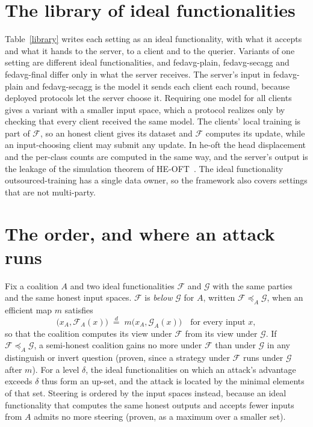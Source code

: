 \documentclass{labreport}
\newcommand{\IF}{\mathcal{F}}
\newcommand{\IG}{\mathcal{G}}
\begin{document}
\section{The library of ideal functionalities}

Table~\ref{library} writes each setting as an ideal functionality, with what it accepts and what it hands to the server, to a client and to the querier.
Variants of one setting are different ideal functionalities, and fedavg-plain, fedavg-secagg and fedavg-final differ only in what the server receives.
The server's input in fedavg-plain and fedavg-secagg is the model it sends each client each round, because deployed protocols let the server choose it.
Requiring one model for all clients gives a variant with a smaller input space, which a protocol realizes only by checking that every client received the same model.
The clients' local training is part of $\IF$, so an honest client gives its dataset and $\IF$ computes its update, while an input-choosing client may submit any update.
In he-oft the head displacement and the per-class counts are computed in the same way, and the server's output is the leakage of the simulation theorem of HE-OFT~\cite{KSK26}.
The ideal functionality outsourced-training has a single data owner, so the framework also covers settings that are not multi-party.



\section{The order, and where an attack runs}

Fix a coalition $A$ and two ideal functionalities $\IF$ and $\IG$ with the same parties and the same honest input spaces.
$\IF$ is \emph{below} $\IG$ for $A$, written $\IF\preceq_A\IG$, when an efficient map $m$ satisfies
\[
  \bigl(x_A,\IF_A(x)\bigr)\;\stackrel{d}{=}\;m\bigl(x_A,\IG_A(x)\bigr)\quad\text{for every input } x,
\]
so that the coalition computes its view under $\IF$ from its view under $\IG$.
If $\IF\preceq_A\IG$, a semi-honest coalition gains no more under $\IF$ than under $\IG$ in any distinguish or invert question (proven, since a strategy under $\IF$ runs under $\IG$ after $m$).
For a level $\delta$, the ideal functionalities on which an attack's advantage exceeds $\delta$ thus form an up-set, and the attack is located by the minimal elements of that set.
Steering is ordered by the input spaces instead, because an ideal functionality that computes the same honest outputs and accepts fewer inputs from $A$ admits no more steering (proven, as a maximum over a smaller set).
\end{document}
